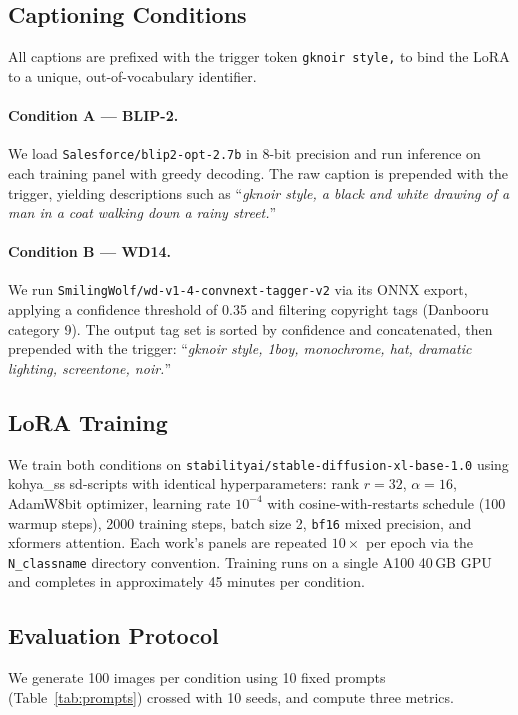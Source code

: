 \documentclass[10pt,twocolumn,letterpaper]{article}
\begin{document}
\subsection{Captioning Conditions}

All captions are prefixed with the trigger token \texttt{gknoir style,} to bind the LoRA to a unique, out-of-vocabulary identifier.

\paragraph{Condition A — BLIP-2.}
We load \texttt{Salesforce/blip2-opt-2.7b} in 8-bit precision and run inference on each training panel with greedy decoding.
The raw caption is prepended with the trigger, yielding descriptions such as ``\textit{gknoir style, a black and white drawing of a man in a coat walking down a rainy street.}''

\paragraph{Condition B — WD14.}
We run \texttt{SmilingWolf/wd-v1-4-convnext-tagger-v2} via its ONNX export, applying a confidence threshold of 0.35 and filtering copyright tags (Danbooru category 9).
The output tag set is sorted by confidence and concatenated, then prepended with the trigger: ``\textit{gknoir style, 1boy, monochrome, hat, dramatic lighting, screentone, noir.}''

\subsection{LoRA Training}

We train both conditions on \texttt{stabilityai/stable-diffusion-xl-base-1.0} using kohya\_ss sd-scripts with identical hyperparameters: rank $r=32$, $\alpha=16$, AdamW8bit optimizer, learning rate $10^{-4}$ with cosine-with-restarts schedule (100 warmup steps), 2000 training steps, batch size 2, \texttt{bf16} mixed precision, and xformers attention.
Each work's panels are repeated $10\times$ per epoch via the \texttt{N\_classname} directory convention.
Training runs on a single A100 40\,GB GPU and completes in approximately 45 minutes per condition.

\subsection{Evaluation Protocol}

We generate 100 images per condition using 10 fixed prompts (Table~\ref{tab:prompts}) crossed with 10 seeds, and compute three metrics.
\end{document}
